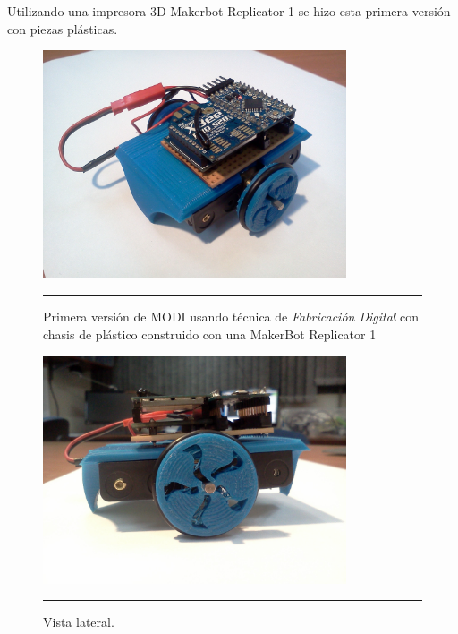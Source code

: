 Utilizando una impresora 3D Makerbot Replicator 1 se hizo esta primera versión con piezas plásticas.

\begin{figure}[htbp]
	\centering
		\includegraphics[width=0.8\textwidth]{./Pictures/MODIrev2.jpg}
		\rule{35em}{0.5pt}
	\caption[modirev1]{Primera versión de MODI usando técnica de \emph{ Fabricación Digital }con chasis de plástico construido con una MakerBot Replicator 1}
	\label{fig:modirev2}
\end{figure}

\begin{figure}[htbp]
	\centering
		\includegraphics[width=0.8\textwidth]{./Pictures/2MODIrev2.jpg}
		\rule{35em}{0.5pt}
	\caption[modirev1]{Vista lateral.}
	\label{fig:2modirev2}
\end{figure}

